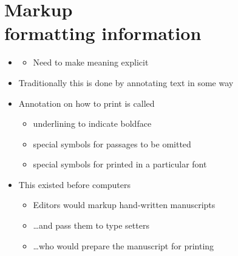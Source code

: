 \documentclass[a4paper,landscape,headrule,footrule,xetex]{foils}
\begin{document}
\section{Markup\\ formatting information}

\MyLogo{}

\begin{itemize}
\item {}
  \begin{itemize}
  \item Need to make meaning explicit
  \end{itemize}
\item Traditionally this is done by annotating text in some way
\end{itemize}


\begin{itemize}
\item Annotation on how to print is called 
  \begin{itemize}
  \item  underlining to indicate boldface
  \item special symbols for passages to be omitted
  \item special symbols for printed in a particular font
  \end{itemize}
\item This existed before computers
  \begin{itemize}
  \item Editors would markup hand-written manuscripts
  \item \ldots and pass them to type setters
  \item \ldots who would prepare the manuscript for printing
  \end{itemize}
\end{itemize}

\end{document}
